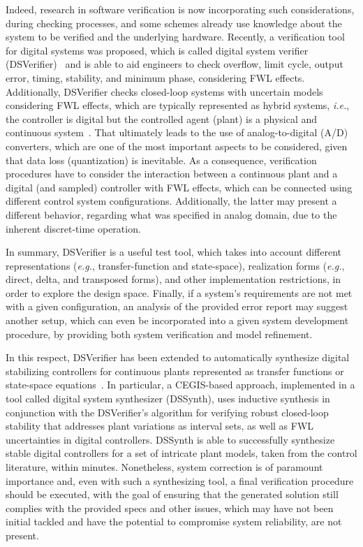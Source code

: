 \documentclass{cta-author}
\begin{document}
Indeed, research in software verification is now incorporating such considerations, during checking processes, and some schemes already use knowledge about the system to be verified and the underlying hardware. Recently, a verification tool for digital systems was proposed, which is called digital system verifier (DSVerifier)~\cite{dsv_spin2015} and is able to aid engineers to check overflow, limit cycle, output error, timing, stability, and minimum phase, considering FWL effects. Additionally, DSVerifier checks closed-loop systems with uncertain models considering FWL effects, which are typically represented as hybrid systems, {\it i.e.}, the controller is digital but the controlled agent (plant) is a physical and continuous system~\cite{Bessa17}. That ultimately leads to the use of analog-to-digital (A/D) converters, which are one of the most important aspects to be considered, given that data loss (quantization) is inevitable. As a consequence, verification procedures have to consider the interaction between a continuous plant and a digital (and sampled) controller with FWL effects, which can be connected using different control system configurations. Additionally, the latter may present a different behavior, regarding what was specified in analog domain, due to the inherent discret-time operation. 


In summary, DSVerifier is a useful test tool, which takes into account different representations ({\it e.g.}, transfer-function and state-space), realization forms ({\it e.g.}, direct, delta, and transposed forms), and other implementation restrictions, in order to explore the design space. Finally, if a system's requirements are not met with a given configuration, an analysis of the provided error report may suggest another setup, which can even be incorporated into a given system development procedure, by providing both system verification and model refinement. 

In this respect, DSVerifier has been extended to automatically synthesize digital stabilizing controllers for continuous plants represented as transfer functions or state-space equations~\cite{Abate17,abatecav2017}. In particular, a CEGIS-based approach, implemented in a tool called digital system synthesizer (DSSynth), uses inductive synthesis in conjunction with the DSVerifier's algorithm for verifying robust closed-loop stability that addresses plant variations as interval sets, as well as FWL uncertainties in digital controllers. DSSynth is able to successfully synthesize stable digital controllers for a set of intricate plant models, taken from the control literature, within minutes. Nonetheless, system correction is of paramount importance and, even with such a synthesizing tool, a final verification procedure should be executed, with the goal of ensuring that the generated solution still complies with the provided specs and other issues, which may have not been initial tackled and have the potential to compromise system reliability, are not present.
\end{document}
